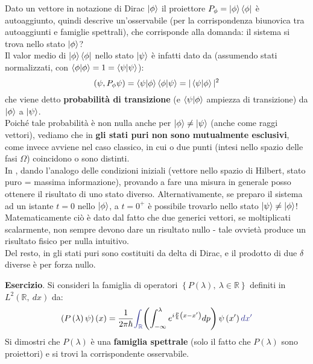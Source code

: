 \documentclass[../../FisicaTeorica.tex]{subfiles}
\begin{document}
\begin{oss}
Dato un vettore in notazione di Dirac $\ket{\phi}$ il proiettore $P_\phi =\ket{\phi}\bra{\phi}$ è autoaggiunto, quindi descrive un'osservabile (per la corrispondenza biunovica tra autoaggiunti e famiglie spettrali), che corrisponde alla domanda: il sistema si trova nello stato $\ket{\phi}$?\\
Il valor medio di $\ket{\phi}\bra{\phi}$ nello stato $\ket{\psi}$ è infatti dato da (assumendo stati normalizzati, con $\braket{\phi|\phi} = 1 = \braket{\psi|\psi}$):
\[
(\psi, P_\phi \psi) = 
\braket{\psi|\phi}\braket{\phi|\psi} = |\braket{\psi|\phi}|^2
\]
che viene detto \textbf{probabilità di transizione} (e $\braket{\psi|\phi}$ ampiezza di transizione) da $\ket{\phi}$ a $\ket{\psi}$.\\
Poiché tale probabilità è non nulla anche per $\ket{\phi}\neq\ket{\psi}$ (anche come raggi vettori), vediamo che in \MQ \textbf{gli stati puri non sono mutualmente esclusivi}, come invece avviene nel caso classico, in cui o due punti (intesi nello spazio delle fasi $\Omega$) coincidono o sono distinti.\\
In \MQ, dando l'analogo delle condizioni iniziali (vettore nello spazio di Hilbert, stato puro = massima informazione), provando a fare una misura in generale posso ottenere il risultato di uno stato diverso. Alternativamente, se preparo il sistema ad un istante $t=0$ nello $\ket{\phi}$, a $t=0^+$ è possibile trovarlo nello stato $\ket{\psi}\neq\ket{\phi}$!\\
Matematicamente ciò è dato dal fatto che due generici vettori, se moltiplicati scalarmente, non sempre devono dare un risultato nullo - tale ovvietà produce un risultato fisico per nulla intuitivo.\\
Del resto, in \MC gli stati puri sono costituiti da delta di Dirac, e il prodotto di due $\delta$ diverse è per forza nullo.
\end{oss}
\textbf{Esercizio}.  Si consideri la famiglia di operatori $\left\{P\left(\lambda\right),\ \lambda\in\mathbb{R}\right\}$ definiti in $L^2\left(\mathbb{R},\ dx\right)$ da:
\[
\left(P\left(\lambda\right)\psi\right)\left(x\right)=\frac{1}{2\pi\hbar}\textcolor{Blue}{\int_{\mathbb{R}}}{\left(\int_{-\infty}^{\lambda}e^{i\frac{p}{\hbar}\left(x-x'\right)}dp\right)\psi\left(x'\right)\textcolor{Blue}{dx'}}
\]
Si dimostri che $P\left(\lambda\right)$ è una \textbf{famiglia spettrale} (solo il fatto che $P\left(\lambda\right)$ sono proiettori) e si trovi la corrispondente osservabile.\\
\end{document}

